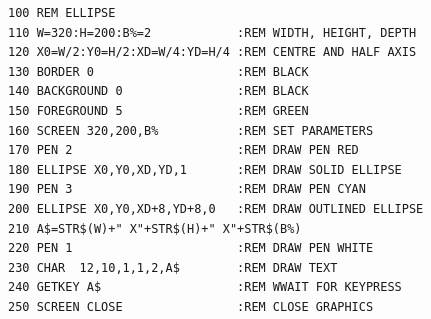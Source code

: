 \begin{description}[leftmargin=2cm,style=nextline]
\newpage
\begin{tcolorbox}[colback=black,coltext=white]
\verbatimfont{\codefont}
\begin{verbatim}
100 REM ELLIPSE
110 W=320:H=200:B%=2            :REM WIDTH, HEIGHT, DEPTH
120 X0=W/2:Y0=H/2:XD=W/4:YD=H/4 :REM CENTRE AND HALF AXIS
130 BORDER 0                    :REM BLACK
140 BACKGROUND 0                :REM BLACK
150 FOREGROUND 5                :REM GREEN
160 SCREEN 320,200,B%           :REM SET PARAMETERS
170 PEN 2                       :REM DRAW PEN RED
180 ELLIPSE X0,Y0,XD,YD,1       :REM DRAW SOLID ELLIPSE
190 PEN 3                       :REM DRAW PEN CYAN
200 ELLIPSE X0,Y0,XD+8,YD+8,0   :REM DRAW OUTLINED ELLIPSE
210 A$=STR$(W)+" X"+STR$(H)+" X"+STR$(B%)
220 PEN 1                       :REM DRAW PEN WHITE
230 CHAR  12,10,1,1,2,A$        :REM DRAW TEXT
240 GETKEY A$                   :REM WWAIT FOR KEYPRESS
250 SCREEN CLOSE                :REM CLOSE GRAPHICS
\end{verbatim}
\end{tcolorbox}
\end{description}

\newpage
